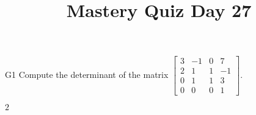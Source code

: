 \documentclass{sbgLAquiz}
\title{Mastery Quiz Day 27 }
\begin{document}
\begin{problem}{G1}
Compute the determinant of the matrix $\begin{bmatrix} 3 & -1 & 0  & 7 \\ 2 & 1 & 1 & -1  \\ 0 & 1 & 1 & 3 \\ 0 & 0 & 0 & 1   \end{bmatrix}$.
\end{problem}
\begin{solution}
$2$
\end{solution}
\end{document}
